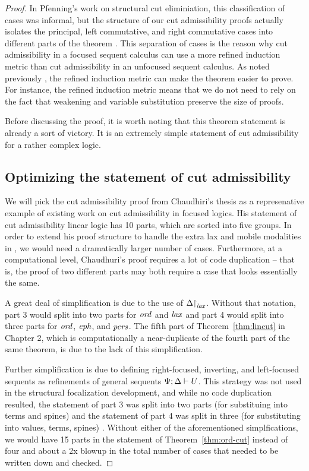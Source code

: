 \begin{proof}
In Pfenning's work on structural cut eliminiation, this classification
of cases was informal, but the structure of our cut admissibility
proofs actually isolates the principal, left commutative, and right
commutative cases into different parts of the theorem
\cite{pfenning00structural}. This separation of cases is the reason
why cut admissibility in a focused sequent calculus can use a more
refined induction metric than cut admissibility in an unfocused
sequent calculus. As noted previously \cite{simmons11structural}, the
refined induction metric can make the theorem easier to prove.  For
instance, the refined induction metric means that we do not need to
rely on the fact that weakening and variable substitution preserve
the size of proofs.

Before discussing the proof, it is worth noting that this theorem
statement is already a sort of victory. It is an extremely simple
statement of cut admissibility for a rather complex logic.

\subsection{Optimizing the statement of cut admissibility}

We will pick the cut admissibility proof
from Chaudhiri's thesis \cite{chaudhuri06focused} as a represenative
example of existing work on cut admissibility in focused logics.  His
statement of cut admissibility linear logic has 10 parts, 
which are sorted into
five groups. In order to extend his
proof structure to handle the extra lax and mobile modalities in
\ollll, we would need a dramatically larger number of
cases. Furthermore, at a computational level, Chaudhuri's proof
requires a lot of code duplication -- that is, the proof of two
different parts may both require a case that looks essentially the
same.

A great deal of simplification is due to the use of
${\Delta}{\upharpoonright}_{{\it lax}}$. Without that notation, part 3 would
split into two parts for ${\it ord}$ and ${\it lax}$ and part 4 would split
into three parts for ${\it ord}$, ${\it eph}$, and ${\it pers}$. The fifth part
of Theorem~\ref{thm:lincut} in Chapter 2, which is computationally a
near-duplicate of the fourth part of the same theorem, is due to the
lack of this simplification.

Further simplification is due to defining right-focused, inverting,
and left-focused sequents as refinements of general sequents
${\Psi};{\Delta} \vdash {U}$. This strategy was not used in the structural
focalization development, and while no code duplication resulted, the
statement of part 3 was split into two parts (for substituing into
terms and spines) and the statement of part 4 was split in three (for
substituting into values, terms, spines) \cite{simmons11structural}.
Without either of the aforementioned simplfications, we would have 15
parts in the statement of Theorem~\ref{thm:ord-cut} instead of four
and about a 2x blowup in the total number of cases that needed to be
written down and checked.


\end{proof}

